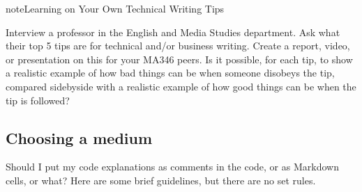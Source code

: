 \documentclass[letterpaper,10pt,english]{sphinxmanual}
\begin{document}
\begin{sphinxadmonition}{note}{Learning on Your Own \sphinxhyphen{} Technical Writing Tips}

Interview a professor in the English and Media Studies department.  Ask what their top 5 tips are for technical and/or business writing.  Create a report, video, or presentation on this for your MA346 peers.  Is it possible, for each tip, to show a realistic example of how bad things can be when someone disobeys the tip, compared side\sphinxhyphen{}by\sphinxhyphen{}side with a realistic example of how good things can be when the tip is followed?
\end{sphinxadmonition}


\subsection{Choosing a medium}
\label{\detokenize{chapter-5-before-and-after:choosing-a-medium}}
Should I put my code explanations as comments in the code, or as Markdown cells, or what?  Here are some brief guidelines, but there are no set rules.
\end{document}
